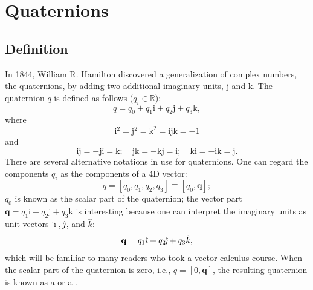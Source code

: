 \section{Quaternions}
\label{\chabbr:sec:quaternions}

\subsection{Definition}
In 1844, William R. Hamilton \cite{hamilton1844a} discovered a generalization of complex numbers, the quaternions, by adding two additional imaginary units, $\mathrm{j}$ and $\mathrm{k}$.  The quaternion $q$ is defined as follows ($q_i\in\mathbb{R}$):
\begin{equation}
	q = q_0 + q_1\mathrm{i}+q_2\mathrm{j}+q_3\mathrm{k},
\end{equation}
where
\begin{equation}
	\mathrm{i}^2=\mathrm{j}^2=\mathrm{k}^2=\mathrm{i}\mathrm{j}\mathrm{k}=-1\label{\chabbr:eq:quatunits}
\end{equation}
and
\begin{equation}
	\mathrm{i}\mathrm{j}=-\mathrm{j}\mathrm{i}=\mathrm{k};\quad \mathrm{j}\mathrm{k}=-\mathrm{k}\mathrm{j}=\mathrm{i};\quad \mathrm{k}\mathrm{i}=-\mathrm{i}\mathrm{k}=\mathrm{j}.
\end{equation}
There are several alternative notations in use for quaternions. One can regard the components $q_i$ as the components of a 4D vector:
\begin{equation}
	q = \left[ q_0, q_1, q_2, q_3\right] \equiv \left[q_0,\mathbf{q}\right];
\end{equation}
$q_0$ is known as the scalar part  of the quaternion; the vector part $\mathbf{q}=q_1\mathrm{i}+q_2\mathrm{j}+q_3\mathrm{k}$ is interesting because one can interpret the imaginary units as unit vectors $\hat{\mathrm{\imath}}$, $\hat{\mkern-3mu\mathrm{\jmath}}$, and $\hat{k}$:
\begin{equation}
	\mathbf{q} = q_1\hat{\mathrm{\imath}}+q_2\hat{\mkern-3mu\mathrm{\jmath}}+q_3\hat{k},
\end{equation}
which will be familiar to many readers who took a vector calculus course.  When the scalar part of the quaternion is zero, i.e., $q=[0,\mathbf{q}]$, the resulting quaternion is known as a  or a .

